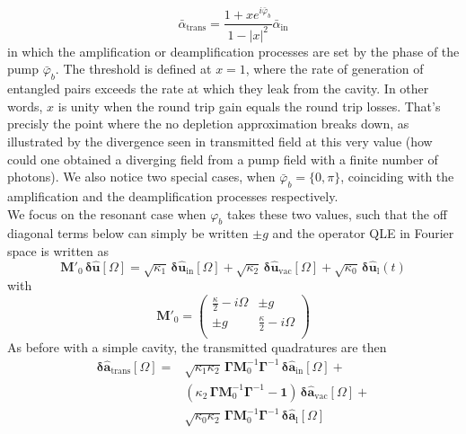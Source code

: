 \begin{equation}
   \bar{\alpha}_{\mathrm{trans}} =\frac{1+x e^{i\bar{\varphi}_b}}{1 - |x|^2}  \bar{\alpha}_\textrm{in} 
\end{equation}
in which the amplification or deamplification processes are set by the phase of the pump $\bar{\varphi}_b$. The threshold is defined at $x=1$, where the rate of generation of entangled pairs exceeds the rate at which they leak from the cavity. In other words, $x$ is unity when the round trip gain equals the round trip losses. That's precisly the point where the no depletion approximation breaks down, as illustrated by the divergence seen in transmitted field at this very value (how could one obtained a diverging field from a pump field with a finite number of photons). We also notice two special cases, when $\bar\varphi_b=\{0,\pi\}$, coinciding with the amplification and the deamplification processes respectively. \\
We focus on the resonant case when $\varphi_b$ takes these two values, such that the off diagonal terms below can simply be written $\pm g$ and the operator QLE in Fourier space is written as 
\begin{equation}
     \mathbf{M'}_0 \,  \mathbf{\delta \hat{u}}[\Omega]  = \sqrt{\kappa_{\mathrm{1}}} \, \mathbf{\delta \hat{u}_{\mathrm{in}}}[\Omega]  + \sqrt{\kappa_2} \, \mathbf{\delta \hat{u}_{\mathrm{vac}}}[\Omega]  + \sqrt{\kappa_0} \, \mathbf{\delta \hat{u}_{\mathrm{l}}}(t)  
\end{equation}
with 
\begin{equation}
  \mathbf{M'}_0 =\begin{pmatrix}
  \frac{\kappa}{2}-i\Omega & \pm g\\ 
  \pm g  & \frac{\kappa}{2}-i\Omega\\ 
  \end{pmatrix} 
\end{equation}
As before with a simple cavity, the transmitted quadratures are then 
\begin{equation}
\begin{split}
  \mathbf{\delta \hat{a}_{\mathrm{trans}}}[\Omega]  = &\sqrt{\kappa_1 \kappa_2} \, \mathbf{\Gamma} \mathbf{M}^{-1}_0\mathbf{\Gamma}^{-1}\, \mathbf{\delta \hat{a}_{\mathrm{in}}}[\Omega] + \\
  &  (\kappa_2 \,\mathbf{\Gamma}  \mathbf{M}^{-1}_0 \mathbf{\Gamma}^{-1}- \mathbf{1}) \, \mathbf{\delta \hat{a}_{\mathrm{vac}}}[\Omega] +\\
  & \sqrt{\kappa_0 \kappa_2} \, \mathbf{\Gamma} \mathbf{M}^{-1}_0\mathbf{\Gamma}^{-1}\,\mathbf{\delta \hat{a}_{\mathrm{l}}}[\Omega]
\end{split}
\end{equation}
